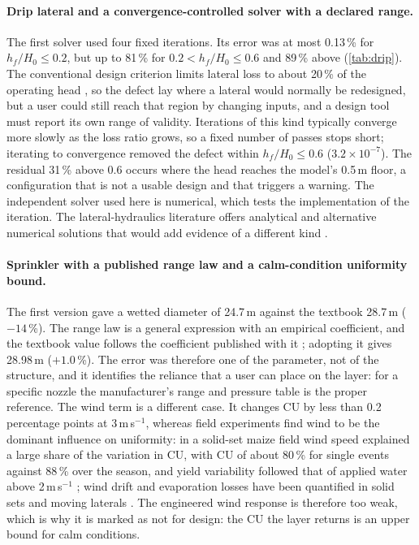 \documentclass[preprint,12pt]{elsarticle}
\begin{document}
\paragraph{Drip lateral and a convergence-controlled solver with a declared range.} The first solver used four fixed iterations. Its error was at most 0.13\,\% for $h_f/H_0\le0.2$, but up to 81\,\% for $0.2<h_f/H_0\le0.6$ and 89\,\% above (\cref{tab:drip}). The conventional design criterion limits lateral loss to about 20\,\% of the operating head \cite{KellerKarmeli1974,Keller1990}, so the defect lay where a lateral would normally be redesigned, but a user could still reach that region by changing inputs, and a design tool must report its own range of validity. Iterations of this kind typically converge more slowly as the loss ratio grows, so a fixed number of passes stops short; iterating to convergence removed the defect within $h_f/H_0\le0.6$ ($3.2\times10^{-7}$). The residual 31\,\% above 0.6 occurs where the head reaches the model's 0.5\,m floor, a configuration that is not a usable design and that triggers a warning. The independent solver used here is numerical, which tests the implementation of the iteration. The lateral-hydraulics literature offers analytical and alternative numerical solutions that would add evidence of a different kind \cite{Warrick1988,Scaloppi1993}.

\paragraph{Sprinkler with a published range law and a calm-condition uniformity bound.} The first version gave a wetted diameter of 24.7\,m against the textbook 28.7\,m ($-14$\,\%). The range law is a general expression with an empirical coefficient, and the textbook value follows the coefficient published with it \cite{Keller1990}; adopting it gives 28.98\,m ($+1.0$\,\%). The error was therefore one of the parameter, not of the structure, and it identifies the reliance that a user can place on the layer: for a specific nozzle the manufacturer's range and pressure table is the proper reference. The wind term is a different case. It changes CU by less than 0.2 percentage points at $3$\,m\,s$^{-1}$, whereas field experiments find wind to be the dominant influence on uniformity: in a solid-set maize field wind speed explained a large share of the variation in CU, with CU of about 80\,\% for single events against 88\,\% over the season, and yield variability followed that of applied water above 2\,m\,s$^{-1}$ \cite{Dechmi2003}; wind drift and evaporation losses have been quantified in solid sets and moving laterals \cite{Playan2005}. The engineered wind response is therefore too weak, which is why it is marked as not for design: the CU the layer returns is an upper bound for calm conditions.
\end{document}
